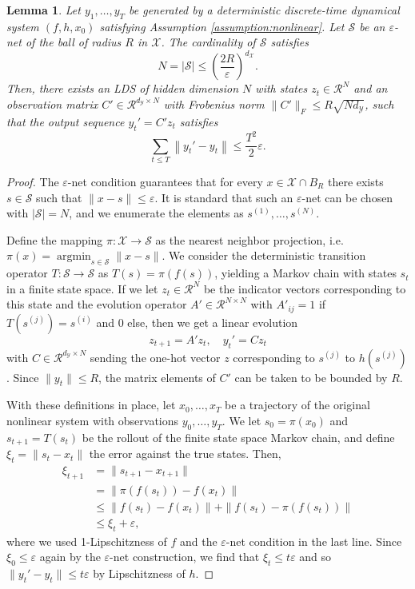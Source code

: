 \documentclass[11pt]{article}
\DeclareMathOperator*{\argmin}{argmin}
\def\R{{\mathcal R}}
\newcommand{\norm}[1]{\left\lVert#1\right\rVert}
\def\epsilon{\varepsilon}
\def\R{\ensuremath{\mathcal R}}
\newtheorem{lemma}[theorem]{Lemma}
\numberwithin{equation}{section}
\begin{document}
\begin{lemma}
\label{lemma:discretization}
    Let $y_1, \ldots, y_T$ be generated by a deterministic discrete-time dynamical system $(f, h, x_0)$ satisfying Assumption \ref{assumption:nonlinear}. Let $\mathcal{S}$ be an $\epsilon$-net of the ball of radius $R$ in $\mathcal{X}$. The cardinality of $\mathcal{S}$ satisfies 
    $$N = |\mathcal{S}| \leq \left(\frac{2R}{\epsilon}\right)^{d_\mathcal{X}}.$$
    Then, there exists an LDS of hidden dimension $N$ with states $z_t \in \R^N$ and an observation matrix $C' \in \R^{d_\mathcal{Y} \times N}$ with Frobenius norm $\|C'\|_F \leq R \sqrt{Nd_{\mathcal{Y}}}$, such that the output sequence $y_t' = C'z_t$ satisfies 
    $$\sum_{t \leq T }\norm{y_t' - y_t} \leq \frac{T^2}{2}\epsilon.$$
\end{lemma}
\begin{proof}
    The $\epsilon$-net condition guarantees that for every $x \in \mathcal{X} \cap B_R$ there exists $s \in \mathcal{S}$ such that $\|x - s\| \leq \epsilon$. It is standard that such an $\epsilon$-net can be chosen with $|\mathcal{S}| = N$, and we enumerate the elements as $s^{(1)}, \ldots, s^{(N)}$.

    Define the mapping $\pi: \mathcal{X} \to \mathcal{S}$ as the nearest neighbor projection, i.e. $\pi(x) = \argmin_{s \in \mathcal{S}} \|x - s\|$. 
We consider the deterministic transition operator $T: \mathcal{S} \to \mathcal{S}$ as $T(s) = \pi(f(s))$, yielding a Markov chain with states $s_t$ in a finite state space. If we let $z_t \in \R^N$ be the indicator vectors corresponding to this state and the evolution operator $A' \in \R^{N \times N}$ with $A'_{ij} = 1$ if $T(s^{(j)}) = s^{(i)}$ and $0$ else, then we get a linear evolution
$$z_{t+1} = A'z_t, \quad y_t' = Cz_t$$
with $C \in \R^{d_\mathcal{Y} \times N}$ sending the one-hot vector $z$ corresponding to $s^{(j)}$ to $h(s^{(j)})$. Since $\|y_t\| \leq R$, the matrix elements of $C'$ can be taken to be bounded by $R$.

With these definitions in place, let $x_0, \ldots, x_T$ be a trajectory of the original nonlinear system with observations $y_0, \ldots, y_T$. We let $s_0 = \pi(x_0)$ and $s_{t+1} = T(s_t)$ be the rollout of the finite state space Markov chain, and define $\xi_t = \|s_t - x_t\|$ the error against the true states. Then,
\begin{align*}
    \xi_{t+1} &= \|s_{t+1} - x_{t+1}\| \\
    &= \|\pi (f(s_t)) - f(x_t)\| \\ &\leq \|f(s_t) - f(x_t)\| + \|f(s_t) - \pi (f(s_t))\| \\
    &\leq \xi_t + \epsilon,
\end{align*}
where we used 1-Lipschitzness of $f$ and the $\epsilon$-net condition in the last line. Since $\xi_0 \leq \epsilon$ again by the $\epsilon$-net construction, we find that $\xi_t \leq t\epsilon$ and so $\|y_t' - y_t\| \leq t \epsilon$
by Lipschitzness of $h$.
\end{proof}
\end{document}
